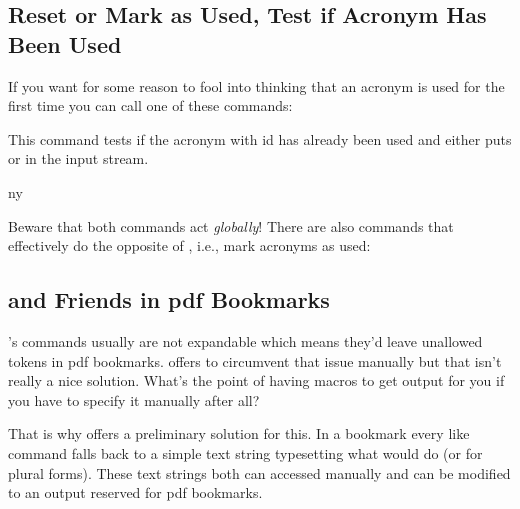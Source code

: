 \documentclass[DIV10,toc=index,toc=bib,hyperfootnotes=false]{cnpkgdoc}
\begin{document}
\subsection{Reset or Mark as Used, Test if Acronym Has Been Used}

If you want for some reason to fool \acro into thinking that an acronym is used
for the first time you can call one of these commands:
\begin{beschreibung}
 \newline
   This command tests if the acronym with \ac{id}
    has already been used and either puts  or
    in the input stream.
\end{beschreibung}
\begin{beispiel}
 \ac{ny}
\end{beispiel}
Beware that both commands act \emph{globally}! There are also commands that
effectively do the opposite of , i.e., mark acronyms as used:
\begin{beschreibung}
\end{beschreibung}

\subsection{ and Friends in \acs*{pdf} Bookmarks}
\noindent{}\acro's commands usually are not expandable which
means they'd leave unallowed tokens in \acs{pdf} bookmarks. 
offers  to circumvent that issue manually but that isn't
really a nice solution. What's the point of having macros to get output for you
if you have to specify it manually after all?

That is why \acro offers a preliminary solution for this. In a bookmark every
 like command falls back to a simple text string typesetting what 
would do (or  for plural forms). These text strings both can accessed
manually and can be modified to an output reserved for \acs{pdf} bookmarks.
\end{document}

